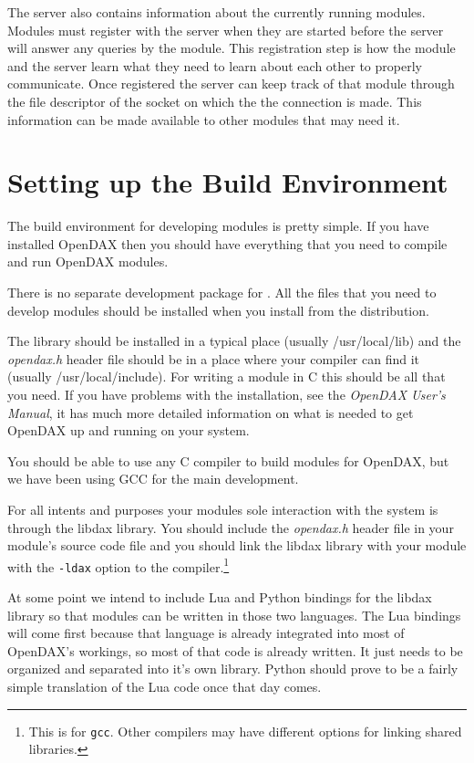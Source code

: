 The server also contains information about the currently running modules.  Modules must register with the server when they are started before the server will answer any queries by the module.  This registration step is how the module and the server learn what they need to learn about each other to properly communicate.  Once registered the server can keep track of that module through the file descriptor of the socket on which the the connection is made.  This information can be made available to other modules that may need it.



\section{Setting up the Build Environment}
The build environment for developing modules is pretty simple.  If you have installed OpenDAX then you should have everything that you need to compile and run OpenDAX modules.

There is no separate development package for \opendax.  All the files that you need to develop modules should be installed when you install \opendax from the distribution.

The library should be installed in a typical place (usually /usr/local/lib) and the \textit{opendax.h} header file should be in a place where your compiler can find it (usually /usr/local/include).  For writing a module in C this should be all that you need.  If you have problems with the installation, see the \emph{OpenDAX User's Manual}, it has much more detailed information on what is needed to get OpenDAX up and running on your system.

You should be able to use any C compiler to build modules for OpenDAX, but we have been using GCC for the main development.

For all intents and purposes your modules sole interaction with the \opendax system is through the libdax library.  You should include the \emph{opendax.h} header file in your module's source code file and you should link the libdax library with your module with the \verb|-ldax| option to the compiler.\footnote{This is for \texttt{gcc}. Other compilers may have different options for linking shared libraries.}

At some point we intend to include Lua and Python bindings for the libdax library so that modules can be written in those two languages.  The Lua bindings will come first because that language is already integrated into most of OpenDAX's workings, so most of that code is already written.  It just needs to be organized and separated into it's own library.  Python should prove to be a fairly simple translation of the Lua code once that day comes.
